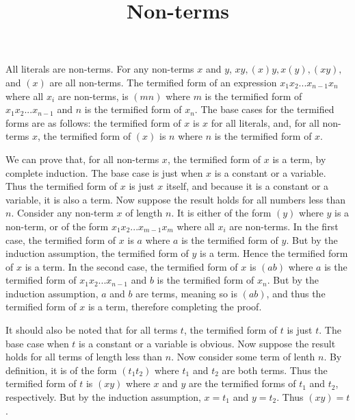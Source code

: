\documentclass{article}
\title{Non-terms}
\theoremstyle{definition}
\begin{document}
\date{}
\maketitle

All literals are non-terms. For any non-terms $x$ and $y$, $xy,(x)y,x(y),(xy),$ and $(x)$ are all non-terms.
The termified form of an expression $x_1x_2...x_{n-1}x_n$ where all $x_i$ are non-terms, is
$(mn)$ where $m$ is the termified form of $x_1x_2...x_{n-1}$ and $n$ is the termified form of 
$x_n$. The base cases for the termified forms are as follows: the termified form of $x$ is $x$ for all
literals, and, for all non-terms $x$, the termified form of $(x)$ is $n$ where $n$ is the 
termified form of $x$.


We can prove that, for all non-terms $x$, the termified form of $x$ is a term, by complete induction. The base case is just when $x$ is a constant or a variable. Thus the 
termified form of $x$ is just $x$ itself, and because it is a constant or a variable, it is also a term. Now suppose the result holds for all numbers less than $n$. Consider 
any non-term $x$ of length $n$. It is either of the form $(y)$ where $y$ is a non-term, or of the form $x_1x_2...x_{m-1}x_m$ where all $x_i$ are non-terms. In the first case, 
the termified form of $x$ is $a$ where $a$ is the termified form of $y$. But by the induction assumption, the termified form of $y$ is a term. Hence the termified form of $x$ is a term.
In the second case, the termified form of $x$ is $(ab)$ where $a$ is the termified form of $x_1x_2...x_{n-1}$ and $b$ is the termified form of 
$x_n$. But by the induction assumption, $a$ and $b$ are terms, meaning so is $(ab)$, and thus the termified form of $x$ is a term, therefore completing the proof.


It should also be noted that for all terms $t$, the termified form of $t$ is just $t$. The base case when $t$ is a constant or a variable is obvious. Now suppose the result holds for all 
terms of length less than $n$. Now consider some term of lenth $n$. By definition, it is of the form $(t_1t_2)$ where $t_1$ and $t_2$ are both terms. Thus the termified form of 
$t$ is $(xy)$ where $x$ and $y$ are the termified forms of $t_1$ and $t_2$, respectively. But by the induction assumption, $x=t_1$ and $y=t_2$. Thus $(xy)=t$.
\end{document}
